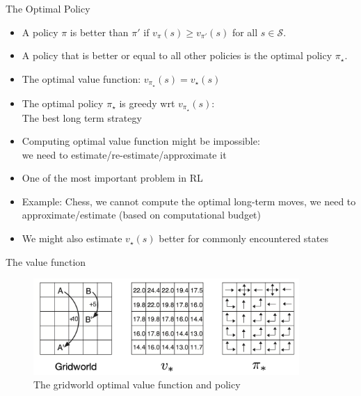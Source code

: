 \documentclass[10pt]{beamer}
\begin{document}
\begin{frame}{The Optimal Policy}

\begin{itemize}
\item A policy $\pi$ is {\color{uured}better} than $\pi'$ if $v_\pi(s) \geq v_{\pi'}(s)$ for all $s \in \mathcal{S}$.\pause
\item A policy that is better or equal to all other policies is the {\color{uured}optimal policy} $\pi_\star$.\pause
\item The optimal value function: $v_{\pi_\star}(s) = v_\star(s)$\pause
\item The optimal policy $\pi_\star$ is greedy wrt $v_{\pi_\star}(s)$: \\The best long term strategy\pause
\item Computing optimal value function might be {\color{uured}impossible}:\\ we need to estimate/re-estimate/approximate it\pause
\item One of the most important problem in RL\pause
\item {\color{uured}Example}: Chess, we cannot compute the optimal long-term moves, we need to approximate/estimate (based on computational budget)\pause
\item We might also estimate $v_\star(s)$ better for commonly encountered states
\end{itemize}

\end{frame}

\begin{frame}{The value function}

\begin{figure}[h]
\centering
\includegraphics[width=0.9\textwidth]{fig/sutton_fig_3_8.png}
\caption{The gridworld optimal value function and policy}
\end{figure}

\end{frame}
\end{document}
